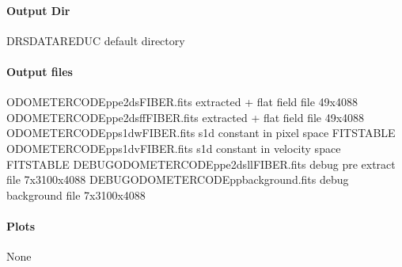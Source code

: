 \documentclass[a4paper,10pt,english]{report}
\begin{document}
\paragraph{Output Dir}
\label{\detokenize{user/spirou/recipes/leak_corr:output-dir}}
\begin{sphinxVerbatim}[commandchars=\\\{\}]
DRS\PYGZus{}DATA\PYGZus{}REDUC    default  directory
\end{sphinxVerbatim}


\paragraph{Output files}
\label{\detokenize{user/spirou/recipes/leak_corr:output-files}}
\begin{sphinxVerbatim}[commandchars=\\\{\}]
ODOMETER\PYGZus{}CODE\PYGZus{}pp\PYGZus{}e2ds\PYGZus{}FIBER.fits               extracted + flat field file 49x4088
ODOMETER\PYGZus{}CODE\PYGZus{}pp\PYGZus{}e2dsff\PYGZus{}FIBER.fits             extracted + flat field file 49x4088
ODOMETER\PYGZus{}CODE\PYGZus{}pp\PYGZus{}s1d\PYGZus{}w\PYGZus{}FIBER.fits              s1d constant in pixel space FITS\PYGZhy{}TABLE
ODOMETER\PYGZus{}CODE\PYGZus{}pp\PYGZus{}s1d\PYGZus{}v\PYGZus{}FIBER.fits              s1d constant in velocity space FITS\PYGZhy{}TABLE
DEBUG\PYGZus{}ODOMETER\PYGZus{}CODE\PYGZus{}pp\PYGZus{}e2dsll\PYGZus{}FIBER.fits       debug pre extract file 7x3100x4088
DEBUG\PYGZus{}ODOMETER\PYGZus{}CODE\PYGZus{}pp\PYGZus{}background.fits           debug background file 7x3100x4088
\end{sphinxVerbatim}


\paragraph{Plots}
\label{\detokenize{user/spirou/recipes/leak_corr:plots}}
\begin{sphinxVerbatim}[commandchars=\\\{\}]
None
\end{sphinxVerbatim}
\end{document}
